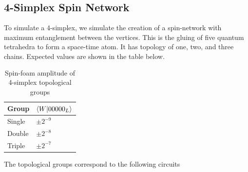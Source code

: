 \documentclass[a4paper,11pt,aps,tightenlines,nofootinbib]{revtex4}
\begin{document}
\subsection{4-Simplex Spin Network}
        To simulate a 4-simplex, we simulate the creation of a spin-network 
        with maximum entanglement between the vertices. This is the gluing of five quantum tetrahedra to form a space-time atom. It has topology of one, two, and three chains. Expected values are shown in the table below.

        \begin{table}[h]
        \begin{centering}
                \begin{tabular}{|l|l|}
                        \hline
                        Group & $\bra{W}\ket{00000_L}$\\ \hline
                        Single & $\pm2^{-9}$ \\ \hline
                        Double & $\pm2^{-8}$ \\ \hline
                        Triple & $\pm2^{-7}$ \\ \hline
                \end{tabular}
                \caption{Spin-foam amplitude of 4-simplex topological groups}
        \end{centering}
        \end{table}

        The topological groups correspond to the following circuits
\end{document}
